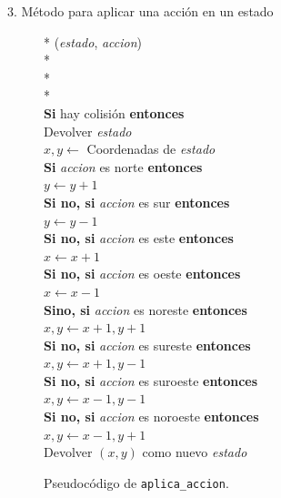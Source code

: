 \documentclass[conference,a4paper]{IEEEtran}
\begin{document}
3. Método para aplicar una acción en un estado

\begin{figure}[h]
  \begin{pseudo}*
    (\textit{estado}, \textit{accion}) \\*
     \\*
     \\*
    \\
    \textbf{Si} hay colisión \textbf{entonces} \\
    \> Devolver \textit{estado} \\
    $x, y \leftarrow$ Coordenadas de \textit{estado} \\
    \textbf{Si} \textit{accion} es norte \textbf{entonces} \\
    \> $y \leftarrow y + 1$ \\
    \textbf{Si no, si} \textit{accion} es sur \textbf{entonces} \\
    \> $y \leftarrow y - 1$ \\
    \textbf{Si no, si} \textit{accion} es este \textbf{entonces} \\
    \> $x \leftarrow x + 1$ \\
    \textbf{Si no, si} \textit{accion} es oeste \textbf{entonces} \\
    \> $x \leftarrow x - 1$ \\
    \textbf{Sino, si} \textit{accion} es noreste \textbf{entonces} \\
    \> $x, y \leftarrow x + 1, y + 1$ \\
    \textbf{Si no, si} \textit{accion} es sureste \textbf{entonces} \\
    \> $x, y \leftarrow x + 1, y - 1$ \\
    \textbf{Si no, si} \textit{accion} es suroeste \textbf{entonces} \\
    \> $x, y \leftarrow x - 1, y - 1$ \\
    \textbf{Si no, si} \textit{accion} es noroeste \textbf{entonces} \\
    \> $x, y \leftarrow x - 1, y + 1$ \\
    Devolver $(x, y)$ como nuevo \textit{estado}
  \end{pseudo}
  \caption{Pseudocódigo de \texttt{aplica\_accion}.}
  \label{fig:aplica_accion}
\end{figure}
\end{document}
